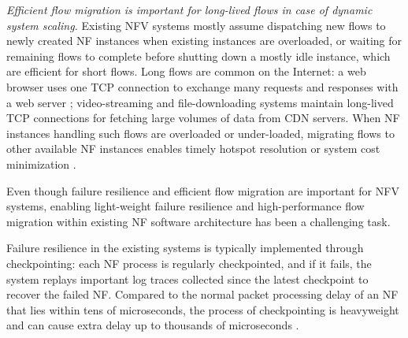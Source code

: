 {\em Efficient flow migration \cite{rajagopalan2013split, gember2015opennf, qazi2017high} is important for long-lived flows in case of dynamic system scaling.} Existing NFV systems \cite{palkar2015e2, gember2012stratos} mostly assume dispatching new flows to newly created NF instances when existing instances are overloaded, or waiting for remaining flows to complete before shutting down a mostly idle instance, which are efficient for short flows. Long flows are common on the Internet:  a web browser uses one TCP connection to exchange many requests and responses with a web server \cite{http-keep-alive}; video-streaming \cite{ffmpeg} and file-downloading \cite{ftp} systems maintain long-lived TCP connections for fetching large volumes of data from CDN servers. When NF instances handling such flows are overloaded or under-loaded, migrating flows to other available NF instances enables timely hotspot resolution or system cost minimization \cite{gember2015opennf}.

Even though failure resilience and efficient flow migration are important for NFV systems, enabling light-weight failure resilience and high-performance flow migration within existing NF software architecture has been a challenging task.

Failure resilience in the existing systems \cite{sherry2015rollback,rajagopalan2013pico} is typically implemented through checkpointing: each NF process is regularly checkpointed, and if it fails, the system replays important log traces collected since the latest checkpoint to recover the failed NF. Compared to the normal packet processing delay of an NF that lies within tens of microseconds, the process of checkpointing is heavyweight and can cause extra delay up to thousands of microseconds \cite{sherry2015rollback, rajagopalan2013pico}.


